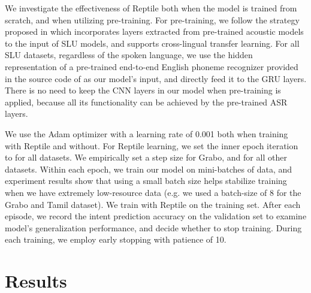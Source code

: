 \documentclass[a4paper]{article}
\begin{document}
	We investigate the effectiveness of Reptile both when the model is trained from scratch, and when utilizing pre-training. For pre-training, we follow the strategy proposed in \cite{Bhosale2019} which incorporates layers extracted from pre-trained acoustic models to the input of SLU models, and supports cross-lingual transfer learning. For all SLU datasets, regardless of the spoken language, we use the hidden representation of a pre-trained end-to-end English phoneme recognizer provided in the source code of \cite{Lugosch2019} as our model's input, and directly feed it to the GRU layers. There is no need to keep the CNN layers in our model when pre-training is applied, because all its functionality can be achieved by the pre-trained ASR layers.
	
	We use the Adam optimizer \cite{Adam} with a learning rate of 0.001 both when training with Reptile and without. For Reptile learning, we set the inner epoch iteration to  for all datasets. We empirically set a step size  for Grabo, and  for all other datasets. Within each epoch, we train our model on mini-batches of data, and experiment results show that using a small batch size helps stabilize training when we have extremely low-resource data (e.g. we used a batch-size of 8 for the Grabo and Tamil dataset). We train with Reptile on the training set. After each episode, we record the intent prediction accuracy on the validation set to examine model's generalization performance, and decide whether to stop training. During each training, we employ early stopping with patience of 10. 
	
	\section{Results}
\end{document}
